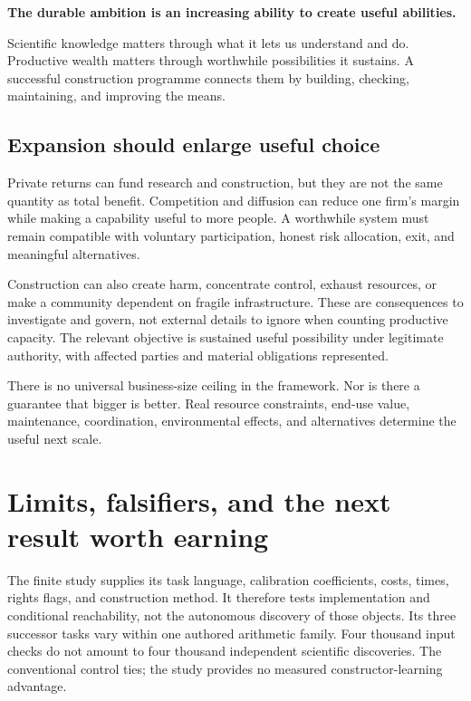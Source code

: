 \begin{thesisbox}
\textbf{The durable ambition is an increasing ability to create useful abilities.}\par
Scientific knowledge matters through what it lets us understand and do. Productive wealth matters through worthwhile possibilities it sustains. A successful construction programme connects them by building, checking, maintaining, and improving the means.
\end{thesisbox}

\subsection{Expansion should enlarge useful choice}

Private returns can fund research and construction, but they are not the same quantity as total benefit. Competition and diffusion can reduce one firm's margin while making a capability useful to more people. A worthwhile system must remain compatible with voluntary participation, honest risk allocation, exit, and meaningful alternatives.

Construction can also create harm, concentrate control, exhaust resources, or make a community dependent on fragile infrastructure. These are consequences to investigate and govern, not external details to ignore when counting productive capacity. The relevant objective is sustained useful possibility under legitimate authority, with affected parties and material obligations represented.

There is no universal business-size ceiling in the framework. Nor is there a guarantee that bigger is better. Real resource constraints, end-use value, maintenance, coordination, environmental effects, and alternatives determine the useful next scale.

\section{Limits, falsifiers, and the next result worth earning}
\label{sec:limits}

The finite study supplies its task language, calibration coefficients, costs, times, rights flags, and construction method. It therefore tests implementation and conditional reachability, not the autonomous discovery of those objects. Its three successor tasks vary within one authored arithmetic family. Four thousand input checks do not amount to four thousand independent scientific discoveries. The conventional control ties; the study provides no measured constructor-learning advantage.

